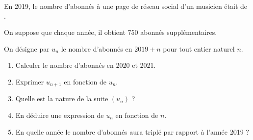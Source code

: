 \medskip

En 2019, le nombre d'abonnés à une page de réseau social d'un musicien était de . 

On suppose que chaque année, il obtient $750$ abonnés supplémentaires.

On désigne par $u_n$ le nombre d'abonnés en $2019 + n$ pour tout entier naturel $n$.

\medskip

\begin{enumerate}
\item Calculer le nombre d'abonnés en 2020 et 2021.
\item Exprimer $u_{n+1}$ en fonction de $u_n$.
\item Quelle est la nature de la suite $\left(u_n\right)$ ?
\item En déduire une expression de $u_n$ en fonction de $n$.
\item En quelle année le nombre d'abonnés aura triplé par rapport à l'année 2019 ?
\end{enumerate}

\bigskip

